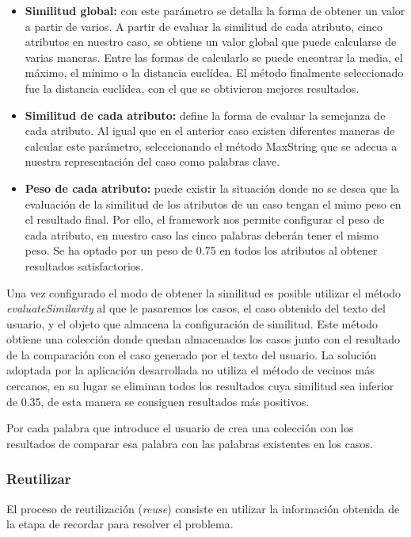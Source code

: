 \begin{itemize}
\tightlist
\item
  \textbf{Similitud global:} con este parámetro se detalla la forma de obtener un valor a partir de varios. A partir de evaluar la similitud de cada atributo, cinco atributos en nuestro caso, se obtiene un valor global que puede calcularse de varias maneras. Entre las formas de calcularlo se puede encontrar la media, el máximo, el mínimo o la distancia euclídea. El método finalmente seleccionado fue la distancia euclídea, con el que se obtivieron mejores resultados.
\item
  \textbf{Similitud de cada atributo:} define la forma de evaluar la semejanza de cada atributo. Al igual que en el anterior caso existen diferentes maneras de calcular este parámetro, seleccionando el método MaxString que se adecua a nuestra representación del caso como palabras clave.
\item
  \textbf{Peso de cada atributo:} puede existir la situación donde no se desea que la evaluación de la similitud de los atributos de un caso tengan el mimo peso en el resultado final. Por ello, el framework nos permite configurar el peso de cada atributo, en nuestro caso las cinco palabras deberán tener el mismo peso. Se ha optado por un peso de 0.75 en todos los atributos al obtener resultados satisfactorios.
\end{itemize}

Una vez configurado el modo de obtener la similitud es posible utilizar el método \emph{evaluateSimilarity} al que le pasaremos los casos, el caso obtenido del texto del usuario, y el objeto que almacena la configuración de similitud. Este método obtiene una colección donde quedan almacenados los casos junto con el resultado de la comparación con el caso generado por el texto del usuario. La solución adoptada por la aplicación desarrollada no utiliza el método de vecinos más cercanos, en su lugar se eliminan todos los resultados cuya similitud sea inferior de 0.35, de esta manera se consiguen resultados más positivos.

Por cada palabra que introduce el usuario de crea una colección con los resultados de comparar esa palabra con las palabras existentes en los casos.

\subsubsection{Reutilizar}\label{reutilizar}

El proceso de reutilización (\emph{reuse}) consiste en utilizar la información obtenida de la etapa de recordar para resolver el problema.

